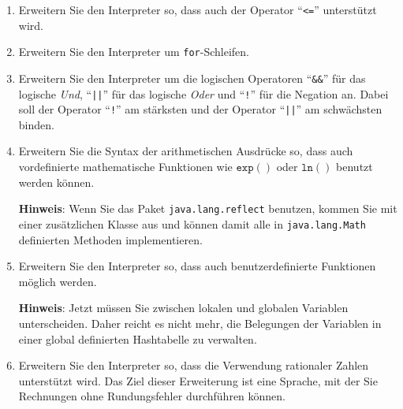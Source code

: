  \exercise
\begin{enumerate}
\renewcommand{\labelenumi}{(\alph{enumi})}
\item Erweitern Sie den Interpreter so, dass auch der Operator ``\texttt{<=}'' unterst\"utzt wird.
\item Erweitern Sie den Interpreter um \texttt{for}-Schleifen.
\item Erweitern Sie den Interpreter um die logischen Operatoren
      ``\texttt{\&\&}'' f\"ur das logische \emph{Und}, ``\texttt{||}'' f\"ur das logische \emph{Oder}
      und ``\texttt{!}'' f\"ur die Negation an.  Dabei soll der Operator ``\texttt{!}'' am
      st\"arksten und der Operator ``\texttt{||}'' am schw\"achsten binden.
\item Erweitern Sie die Syntax der arithmetischen Ausdr\"ucke so, dass auch vordefinierte 
      mathematische Funktionen wie $\texttt{exp}()$ oder $\texttt{ln}()$ benutzt werden
      k\"onnen.

      \textbf{Hinweis}:  Wenn Sie das Paket \texttt{java.lang.reflect} benutzen,
      kommen Sie mit einer zus\"atzlichen Klasse aus und k\"onnen damit alle in
      \texttt{java.lang.Math} definierten Methoden implementieren.
\item Erweitern Sie den Interpreter so, dass auch benutzerdefinierte Funktionen m\"oglich
      werden. 
      
      \textbf{Hinweis}: Jetzt m\"ussen Sie zwischen lokalen und globalen Variablen
      unterscheiden.
      Daher reicht es nicht mehr, die Belegungen der Variablen in einer
      global definierten Hashtabelle zu verwalten. \eox
\item Erweitern Sie den Interpreter so, dass die Verwendung rationaler Zahlen unterst\"utzt wird.
      Das Ziel dieser Erweiterung ist eine Sprache, mit der Sie Rechnungen ohne Rundungsfehler durchf\"uhren k\"onnen.
\end{enumerate}
\renewcommand{\labelenumii}{\arabic{enumii}.}


